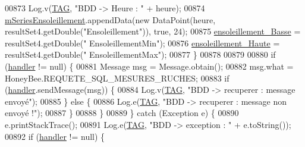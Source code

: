 \begin{DoxyCode}
00873                             Log.v(\hyperlink{classfr_1_1campus_1_1laurainc_1_1honeybee_1_1_ruche_a44739cbb0fa7451c1edc240a3f51c257}{TAG}, \textcolor{stringliteral}{"BDD -> Heure : "} + heure);
00874                             \hyperlink{classfr_1_1campus_1_1laurainc_1_1honeybee_1_1_ruche_a46b1a74ed27674490aff13504ce39b5a}{mSeriesEnsoleillement}.appendData(\textcolor{keyword}{new} DataPoint(heure, 
      resultSet4.getDouble(\textcolor{stringliteral}{"Ensoleillement"})), \textcolor{keyword}{true}, 24);
00875                             \hyperlink{classfr_1_1campus_1_1laurainc_1_1honeybee_1_1_ruche_a715ecfaedd6f31a078667e7f67348666}{ensoleillement\_Basse} = resultSet4.getDouble(\textcolor{stringliteral}{"
      EnsoleillementMin"});
00876                             \hyperlink{classfr_1_1campus_1_1laurainc_1_1honeybee_1_1_ruche_a3b55f2c08cef225db52991e4023201c7}{ensoleillement\_Haute} = resultSet4.getDouble(\textcolor{stringliteral}{"
      EnsoleillementMax"});
00877                         \}
00878 
00879 
00880                         \textcolor{keywordflow}{if} (\hyperlink{classfr_1_1campus_1_1laurainc_1_1honeybee_1_1_ruche_a9689ca454694434549e5fffca876ffae}{handler} != null) \{
00881                             Message msg = Message.obtain();
00882                             msg.what = HoneyBee.REQUETE\_SQL\_MESURES\_RUCHES;
00883                             \textcolor{keywordflow}{if} (\hyperlink{classfr_1_1campus_1_1laurainc_1_1honeybee_1_1_ruche_a9689ca454694434549e5fffca876ffae}{handler}.sendMessage(msg)) \{
00884                                 Log.v(\hyperlink{classfr_1_1campus_1_1laurainc_1_1honeybee_1_1_ruche_a44739cbb0fa7451c1edc240a3f51c257}{TAG}, \textcolor{stringliteral}{"BDD -> recuperer : message envoyé"});
00885                             \} \textcolor{keywordflow}{else} \{
00886                                 Log.e(\hyperlink{classfr_1_1campus_1_1laurainc_1_1honeybee_1_1_ruche_a44739cbb0fa7451c1edc240a3f51c257}{TAG}, \textcolor{stringliteral}{"BDD -> recuperer : message non envoyé !"});
00887                             \}
00888                         \}
00889                     \} \textcolor{keywordflow}{catch} (Exception e) \{
00890                         e.printStackTrace();
00891                         Log.e(\hyperlink{classfr_1_1campus_1_1laurainc_1_1honeybee_1_1_ruche_a44739cbb0fa7451c1edc240a3f51c257}{TAG}, \textcolor{stringliteral}{"BDD -> exception : "} + e.toString());
00892                         \textcolor{keywordflow}{if} (\hyperlink{classfr_1_1campus_1_1laurainc_1_1honeybee_1_1_ruche_a9689ca454694434549e5fffca876ffae}{handler} != null) \{

\end{DoxyCode}
